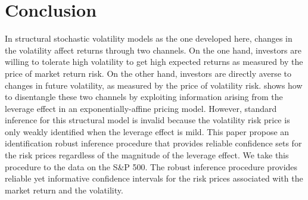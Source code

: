 



\section{Conclusion}\label{sec:risk_conclusion}


In structural stochastic volatility models as the one developed here, changes in the volatility affect returns through two channels. On the one hand, investors are willing to tolerate high volatility to get high expected returns as measured by the price of market return risk. On the other hand, investors are directly averse to changes in future volatility, as measured by the price of volatility risk. \Textcite{han2018leverage} shows how to disentangle these two channels by exploiting information arising from the leverage effect in an exponentially-affine pricing model. However, standard inference for this structural model is invalid because the volatility risk price is only weakly identified when the leverage effect is mild. This paper propose an identification robust inference procedure that provides reliable confidence sets for the risk prices regardless of the magnitude of the leverage effect. We take this procedure to the data on the S\&P 500. The robust inference procedure provides reliable yet informative confidence intervals for the risk prices associated with the market return and the volatility. 




